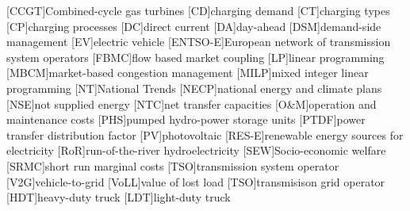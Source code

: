 [CCGT]{Combined-cycle gas turbines}
[CD]{charging demand}
[CT]{charging types}
[CP]{charging processes}
[DC]{direct current}
[DA]{day-ahead}
[DSM]{demand-side management}
[EV]{electric vehicle}
[ENTSO-E]{European network of transmission system operators}
[FBMC]{flow based market coupling}
[LP]{linear programming}
[MBCM]{market-based congestion management}
[MILP]{mixed integer linear programming}
[NT]{National Trends}
[NECP]{national energy and climate plans}
[NSE]{not supplied energy}
[NTC]{net transfer capacities}
[O\&M]{operation and maintenance costs}
[PHS]{pumped hydro-power storage units}
[PTDF]{power transfer distribution factor}
[PV]{photovoltaic}
[RES-E]{renewable energy sources for electricity}
[RoR]{run-of-the-river hydroelectricity}
[SEW]{Socio-economic welfare}
[SRMC]{short run marginal costs}
[TSO]{transmission system operator}
[V2G]{vehicle-to-grid}
[VoLL]{value of lost load}
[TSO]{transmisison grid operator}
[HDT]{heavy-duty truck}
[LDT]{light-duty truck}